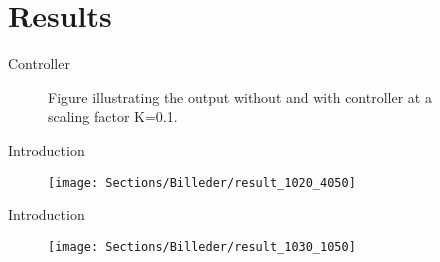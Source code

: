 \section{Results}

\begin{frame}{Controller}{}

\begin{figure}[H]
\centering
 
\caption{Figure illustrating the output without and with controller at a scaling factor K=0.1.}
\end{figure}

\end{frame}

\begin{frame}{Introduction}{}

\begin{figure}[H]
\centering
\texttt{[image: Sections/Billeder/result\_1020\_4050]}
\end{figure}


\end{frame}



\begin{frame}{Introduction}{}

\begin{figure}[H]
\centering
\texttt{[image: Sections/Billeder/result\_1030\_1050]}
\end{figure}


\end{frame}

